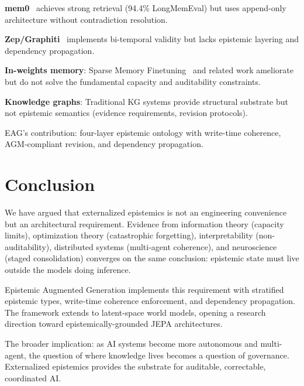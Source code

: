 \documentclass[11pt,letterpaper]{article}
\begin{document}
\textbf{mem0}~\cite{mem0} achieves strong retrieval (94.4\% LongMemEval) but uses append-only architecture without contradiction resolution.

\textbf{Zep/Graphiti}~\cite{graphiti2025} implements bi-temporal validity but lacks epistemic layering and dependency propagation.

\textbf{In-weights memory}: Sparse Memory Finetuning~\cite{sparsemem2025} and related work ameliorate but do not solve the fundamental capacity and auditability constraints.

\textbf{Knowledge graphs}: Traditional KG systems provide structural substrate but not epistemic semantics (evidence requirements, revision protocols).

EAG's contribution: four-layer epistemic ontology with write-time coherence, AGM-compliant revision, and dependency propagation.

\section{Conclusion}

We have argued that externalized epistemics is not an engineering convenience but an architectural requirement. Evidence from information theory (capacity limits), optimization theory (catastrophic forgetting), interpretability (non-auditability), distributed systems (multi-agent coherence), and neuroscience (staged consolidation) converges on the same conclusion: epistemic state must live outside the models doing inference.

Epistemic Augmented Generation implements this requirement with stratified epistemic types, write-time coherence enforcement, and dependency propagation. The framework extends to latent-space world models, opening a research direction toward epistemically-grounded JEPA architectures.

The broader implication: as AI systems become more autonomous and multi-agent, the question of where knowledge lives becomes a question of governance. Externalized epistemics provides the substrate for auditable, correctable, coordinated AI.
\end{document}
